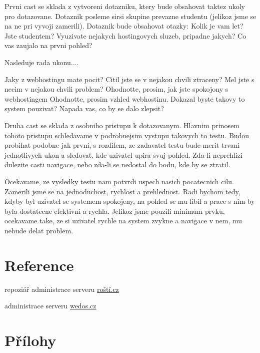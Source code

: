 \documentclass[11pt,a4paper]{article}
\begin{document}
  Prvni cast se sklada z vytvoreni dotazniku, 
  ktery bude obsahovat taktez ukoly pro dotazovane. Dotaznik posleme sirsi skupine
  prevazne studentu (jelikoz jsme se na ne pri vyvoji zamerili). Dotaznik bude obsahovat otazky:
  Kolik je vam let?
  Jste studentem?
  Vyuzivate nejakych hostingovych sluzeb, pripadne jakych?
  Co vas zaujalo na prvni pohled?

  Nasleduje rada ukonu....

  Jaky z webhostingu mate pocit?
  Citil jste se v nejakou chvili ztraceny?
  Mel jste s necim v nejakou chvili problem?
  Ohodnotte, prosim, jak jste spokojony s webhostingem
  Ohodnotte, prosim vzhled webhostinu.
  Dokazal byste takovy to system pouzivat?
  Napada vas, co by se dalo zlepsit?

  Druha cast se sklada z osobniho pristupu k dotazovanym. Hlavnim prinosem tohoto pristupu 
  schledavame v podrobnejsim vystupu takovych to testu. Budou probihat podobne jak prvni, 
  s rozdilem, ze zadavatel testu bude merit trvani jednotlivych ukon a sledovat, kde uzivatel
  upira svuj pohled. Zda-li neprehlizi dulezite casti navigace, nebo zda-li se nedostal 
  do bodu, kde by se ztratil.

  Ocekavame, ze vysledky testu nam potvrdi uspech nasich pocatecnich cilu. Zamerili jsme 
  se na jednoduchost, rychlost a prehlednost. Radi bychom tedy, kdyby byl uzivatel se 
  systemem spokojeny, na pohled se mu libil a prace s nim by byla dostatecne efektivni a rychla.
  Jelikoz jsme pouzili minimum prvku, ocekavame take, ze si uzivatel rychle na system
  zvykne a navigace v nem, mu nebude delat problem.

  \section{Reference}

    \begin{enumerate}[label={[\arabic*]}]
      \item repoziář administrace serveru \href{https://github.com/creckx/pcp}{roští.cz}
      \item administrace serveru \href{https://wedos.cz}{wedos.cz}
    \end{enumerate}

  \appendix
  \newpage

  \section{Přílohy}
\end{document}
